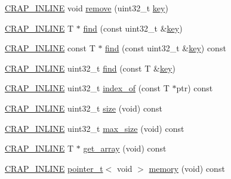 \begin{DoxyCompactItemize}
\item 
\hyperlink{config__x86_8h_a5a40526b8d842e7ff731509998bb0f1c}{C\+R\+A\+P\+\_\+\+I\+N\+L\+I\+N\+E} void \hyperlink{classcrap_1_1indexed__array_a6e7a3fb3a6a9a09fdae51c0e8ffec77a}{remove} (uint32\+\_\+t \hyperlink{classcrap_1_1indexed__array_afdc964d76a19bb2f302fe43fefa5b5f3}{key})
\item 
\hyperlink{config__x86_8h_a5a40526b8d842e7ff731509998bb0f1c}{C\+R\+A\+P\+\_\+\+I\+N\+L\+I\+N\+E} T $\ast$ \hyperlink{classcrap_1_1indexed__array_aa6bbce28615cee47b105fcfd42a23e71}{find} (const uint32\+\_\+t \&\hyperlink{classcrap_1_1indexed__array_afdc964d76a19bb2f302fe43fefa5b5f3}{key})
\item 
\hyperlink{config__x86_8h_a5a40526b8d842e7ff731509998bb0f1c}{C\+R\+A\+P\+\_\+\+I\+N\+L\+I\+N\+E} const T $\ast$ \hyperlink{classcrap_1_1indexed__array_aa7effe2215d00e3f0f123cfef02d14c7}{find} (const uint32\+\_\+t \&\hyperlink{classcrap_1_1indexed__array_afdc964d76a19bb2f302fe43fefa5b5f3}{key}) const 
\item 
\hyperlink{config__x86_8h_a5a40526b8d842e7ff731509998bb0f1c}{C\+R\+A\+P\+\_\+\+I\+N\+L\+I\+N\+E} uint32\+\_\+t \hyperlink{classcrap_1_1indexed__array_a197e2439b74f3861aa477271f489ce12}{find} (const T \&\hyperlink{classcrap_1_1indexed__array_afdc964d76a19bb2f302fe43fefa5b5f3}{key})
\item 
\hyperlink{config__x86_8h_a5a40526b8d842e7ff731509998bb0f1c}{C\+R\+A\+P\+\_\+\+I\+N\+L\+I\+N\+E} uint32\+\_\+t \hyperlink{classcrap_1_1indexed__array_ad588a32c7ec05f42456111aac4752f1f}{index\+\_\+of} (const T $\ast$ptr) const 
\item 
\hyperlink{config__x86_8h_a5a40526b8d842e7ff731509998bb0f1c}{C\+R\+A\+P\+\_\+\+I\+N\+L\+I\+N\+E} uint32\+\_\+t \hyperlink{classcrap_1_1indexed__array_a1ac98bff03a0d2b8fafb5fde8102cf12}{size} (void) const 
\item 
\hyperlink{config__x86_8h_a5a40526b8d842e7ff731509998bb0f1c}{C\+R\+A\+P\+\_\+\+I\+N\+L\+I\+N\+E} uint32\+\_\+t \hyperlink{classcrap_1_1indexed__array_a1d6f82e3d913f90275c752e13b8f1627}{max\+\_\+size} (void) const 
\item 
\hyperlink{config__x86_8h_a5a40526b8d842e7ff731509998bb0f1c}{C\+R\+A\+P\+\_\+\+I\+N\+L\+I\+N\+E} T $\ast$ \hyperlink{classcrap_1_1indexed__array_a78058f9d658fd04c748165dba9180b20}{get\+\_\+array} (void) const 
\item 
\hyperlink{config__x86_8h_a5a40526b8d842e7ff731509998bb0f1c}{C\+R\+A\+P\+\_\+\+I\+N\+L\+I\+N\+E} \hyperlink{structcrap_1_1pointer__t}{pointer\+\_\+t}$<$ void $>$ \hyperlink{classcrap_1_1indexed__array_adea5294fbe10448b8c55c06b8a8c7645}{memory} (void) const 
\end{DoxyCompactItemize}
